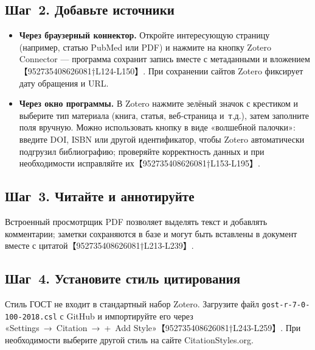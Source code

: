 \documentclass[
  russian,
  12pt,
  a4paper,
]{article}
\providecommand{\tightlist}{%
  \setlength{\itemsep}{0pt}\setlength{\parskip}{0pt}}
\begin{document}
\subsection{Шаг~2. Добавьте
источники}\label{ux448ux430ux433-2.-ux434ux43eux431ux430ux432ux44cux442ux435-ux438ux441ux442ux43eux447ux43dux438ux43aux438}

\begin{itemize}
\tightlist
\item
  \textbf{Через браузерный коннектор.} Откройте интересующую страницу
  (например, статью PubMed или PDF) и нажмите на кнопку Zotero Connector
  --- программа сохранит запись вместе с метаданными и
  вложением【952735408626081†L124-L150】. При сохранении сайтов Zotero
  фиксирует дату обращения и URL.
\item
  \textbf{Через окно программы.} В Zotero нажмите зелёный значок с
  крестиком и выберите тип материала (книга, статья, веб‑страница
  и~т.д.), затем заполните поля вручную. Можно использовать кнопку в
  виде «волшебной палочки»: введите DOI, ISBN или другой идентификатор,
  чтобы Zotero автоматически подгрузил библиографию; проверяйте
  корректность данных и при необходимости исправляйте
  их【952735408626081†L153-L195】.
\end{itemize}

\subsection{Шаг~3. Читайте и
аннотируйте}\label{ux448ux430ux433-3.-ux447ux438ux442ux430ux439ux442ux435-ux438-ux430ux43dux43dux43eux442ux438ux440ux443ux439ux442ux435}

Встроенный просмотрщик PDF позволяет выделять текст и добавлять
комментарии; заметки сохраняются в базе и могут быть вставлены в
документ вместе с цитатой【952735408626081†L213-L239】.

\subsection{Шаг~4. Установите стиль
цитирования}\label{ux448ux430ux433-4.-ux443ux441ux442ux430ux43dux43eux432ux438ux442ux435-ux441ux442ux438ux43bux44c-ux446ux438ux442ux438ux440ux43eux432ux430ux43dux438ux44f}

Стиль ГОСТ не входит в стандартный набор Zotero. Загрузите файл
\texttt{gost-r-7-0-100-2018.csl} с GitHub и импортируйте его через
«Settings~→~Citation~→~+~Add Style»【952735408626081†L243-L259】. При
необходимости выберите другой стиль на сайте CitationStyles.org.
\end{document}
